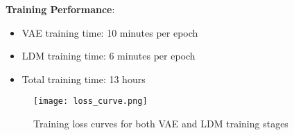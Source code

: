 \textbf{Training Performance}:
\begin{itemize}
    \item VAE training time: 10 minutes per epoch
    \item LDM training time: 6 minutes per epoch
    \item Total training time: 13 hours
\end{itemize}

\begin{figure}[h!]
    \centering
    \texttt{[image: loss\_curve.png]}
    \caption{Training loss curves for both VAE and LDM training stages}
    \label{fig:loss_curve}
\end{figure}